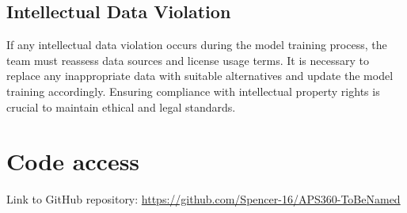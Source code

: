 \documentclass{article} %
\begin{document}
\subsection{Intellectual Data Violation}
If any intellectual data violation occurs during the model training process, the team must reassess data sources and license usage terms. It is necessary to replace any inappropriate data with suitable alternatives and update the model training accordingly. Ensuring compliance with intellectual property rights is crucial to maintain ethical and legal standards.




\label{last_page}

\newpage



\section*{Code access}

Link to GitHub repository: \url{https://github.com/Spencer-16/APS360-ToBeNamed}
\end{document}
